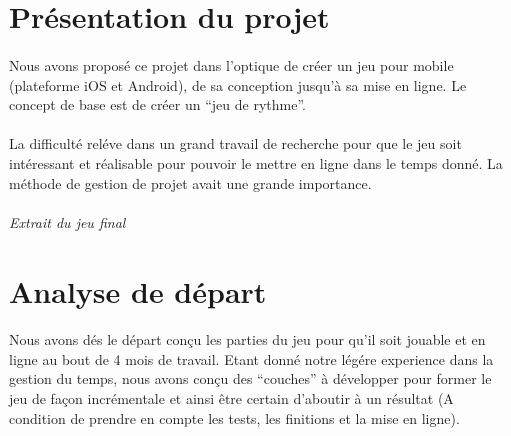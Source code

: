 \section{Présentation du projet}

\paragraph{}
Nous avons proposé ce projet dans l’optique de créer un jeu pour mobile (plateforme iOS et Android), de sa conception jusqu’à sa mise en ligne. Le concept de base est de créer un “jeu de rythme”.

\paragraph{}
La difficulté reléve dans un grand travail de recherche pour que le jeu soit intéressant et réalisable pour pouvoir le mettre en ligne dans le temps donné. La méthode de gestion de projet avait une grande importance.

\paragraph{}
\noindent
{}
\begin{center}
\textit{Extrait du jeu final}
\end{center}

\section{Analyse de départ}

\paragraph{}
Nous avons dés le départ conçu les parties du jeu pour qu’il soit jouable et en ligne au bout de 4 mois de travail. Etant donné notre légére experience dans la gestion du temps, nous avons conçu des “couches” à développer pour former le jeu de façon incrémentale et ainsi être certain d’aboutir à un résultat (A condition de prendre en compte les tests, les finitions et la mise en ligne). 

